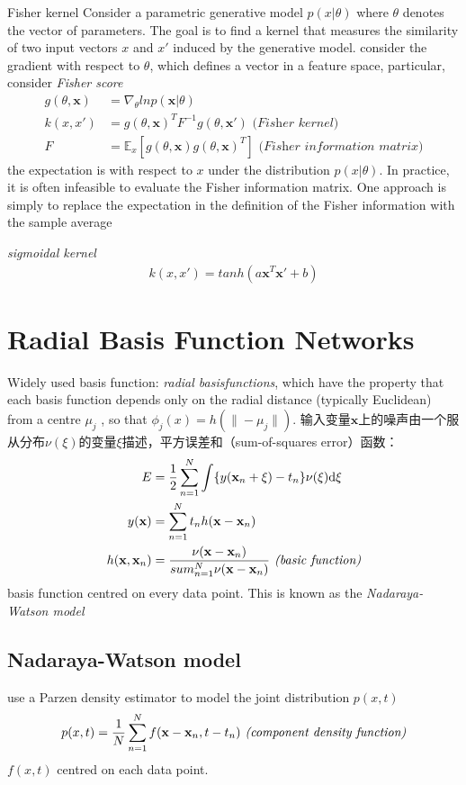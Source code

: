 \documentclass[a4paper]{article}
\begin{document}
{Fisher kernel}
Consider a parametric generative model $p(x|\theta)$ where $\theta$ denotes the vector of parameters. The goal is to find a kernel that measures the similarity of two input vectors $x$ and $x'$ induced by the generative model. consider the gradient with respect to $\theta$, which defines a vector in a feature space, particular, consider \textit{Fisher score}
\begin{align*}
  g(\theta, \mathbf{x}) &= \nabla_\theta ln p(\mathbf{x}|\theta) \\
  k(x, x') &= g(\theta, \mathbf{x})^T F^{-1} g(\theta, \mathbf{x'}) \textit{ (Fisher kernel)}\\
  F &= \mathbb{E}_x [g(\theta, \mathbf{x}) g(\theta, \mathbf{x})^T] \textit{ (Fisher information matrix)}
\end{align*}
the expectation is with respect to $x$ under the distribution $p(x|\theta)$. In practice, it is often infeasible to evaluate the Fisher information matrix. One approach is simply to replace the expectation in the definition of the Fisher information with the sample average

\emph{sigmoidal kernel}
\begin{align}
k(x,x') = tanh(a \mathbf{x}^T \mathbf{x}' + b)
\end{align}

\section{Radial Basis Function Networks}
Widely used basis function: \emph{radial basisfunctions}, which have the property that each basis function depends only on the radial distance (typically Euclidean) from a centre $\mu_j$ , so that $\phi_j(x) = h(\| − \mu_j\|) $.
输入变量$\mathbf{x}$上的噪声由一个服从分布$\nu(\xi)$的变量$\xi$描述，平方误差和（sum-of-squares error）函数：
\begin{align*}
  E &= {1 \over 2} \sum_{n=1}^N \int \{y(\mathbf{x}_n + \xi) - t_n\} \nu(\xi) \mathrm{d} \xi\\
  y(\mathbf{x}) &= \sum_{n=1}^N t_nh(\mathbf{x}-\mathbf{x}_n)\\
  h(\mathbf{x},\mathbf{x}_n) &= { \nu(\mathbf{x} - \mathbf{x}_n) \over sum_{n=1}^N \nu(\mathbf{x} - \mathbf{x}_n)} \textit{ (basic function)}
\end{align*}
basis function centred on every data point. This is known as the \emph{Nadaraya-Watson model}
\subsection{Nadaraya-Watson model}
use a Parzen density estimator to model the joint distribution $p(x, t)$
\begin{align}
  p(x, t) = {1 \over N} \sum_{n=1}^N f(\mathbf{x}-\mathbf{x}_n, t-t_n) \textit{ (component density function)}
\end{align}
 $f(x, t)$ centred on each data point.
\end{document}
